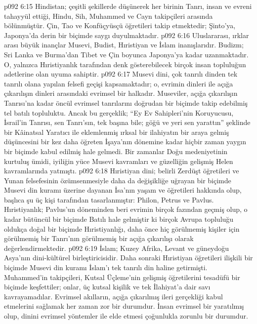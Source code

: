 \vs p092 6:15 Hindistan; çeşitli şekillerde düşünerek her birinin Tanrı, insan ve evreni tahayyül ettiği, Hindu, Sih, Muhammed ve Cayn takipçileri arasında bölünmüştür. Çin, Tao ve Konfüçyüsçü öğretileri takip etmektedir; Şinto’ya, Japonya’da derin bir biçimde saygı duyulmaktadır.
\vs p092 6:16 Uluslararası, ırklar arası büyük inançlar Musevi, Budist, Hıristiyan ve İslam inanışlarıdır. Budizm; Sri Lanka ve Burma’dan Tibet ve Çin boyunca Japonya’ya kadar uzanmaktadır. O, yalnızca Hıristiyanlık tarafından denk gösterebilecek birçok insan topluluğun adetlerine olan uyuma sahiptir.
\vs p092 6:17 Musevi dini, çok tanrılı dinden tek tanrılı olana yapılan felsefi geçişi kapsamaktadır; o, evrimin dinleri ile açığa çıkarılışın dinleri arasındaki evrimsel bir halkadır. Museviler, açığa çıkarılışın Tanrısı’na kadar öncül evrimsel tanrılarını doğrudan bir biçimde takip edebilmiş tel batılı topluluktu. Ancak bu gerçeklik; “Ey Ev Sahipleri’nin Koruyucusu, İsrail’in Tanrısı, sen Tanrı’sın, tek başına bile; göğü ve yeri sen yarattın” şeklinde bir Kâinatsal Yaratıcı ile eklemlenmiş ırksal bir ilahiyatın bir araya gelmiş düşüncesini bir kez daha öğreten İşaya’nın dönemine kadar hiçbir zaman yaygın bir biçimde kabul edilmiş hale gelmedi. Bir zamanlar Doğu medeniyetinin kurtuluş ümidi, iyiliğin yüce Musevi kavramları ve güzelliğin gelişmiş Helen kavramlarında yatmıştı.
\vs p092 6:18 Hıristiyan dini; belirli Zerdüşt öğretileri ve Yunan felsefesinin özümsenmesiyle daha da değişikliğe uğrayan bir biçimde Musevi din kuramı üzerine dayanan İsa’nın yaşam ve öğretileri hakkında olup, başlıca şu üç kişi tarafından tasarlanmıştır: Philon, Petrus ve Pavlus. Hıristiyanlık; Pavlus’un döneminden beri evrimin birçok fazından geçmiş olup, o kadar bütüncül bir biçimde Batılı hale gelmiştir ki birçok Avrupa topluluğu oldukça doğal bir biçimde Hıristiyanlığı, daha önce hiç görülmemiş kişiler için görülmemiş bir Tanrı’nın görülmemiş bir açığa çıkarılışı olarak değerlendirmektedir.
\vs p092 6:19 İslam; Kuzey Afrika, Levant ve güneydoğu Asya’nın dini\hyp{}kültürel birleştiricisidir. Daha sonraki Hıristiyan öğretileri ilişkili bir biçimde Musevi din kuramı İslam’ı tek tanrılı din haline getirmişti. Muhammed’in takipçileri, Kutsal Üçleme’nin gelişmiş öğretilerini tesadüfü bir biçimde keşfettiler; onlar, üç kutsal kişilik ve tek İlahiyat’a dair savı kavrayamadılar. Evrimsel akılların, açığa çıkarılmış ileri gerçekliği  kabul etmelerini sağlamak her zaman zor bir durumdur. İnsan evrimsel bir yaratılmış olup, dinini evrimsel yöntemler ile elde etmesi çoğunlukla zorunlu bir durumdur.
